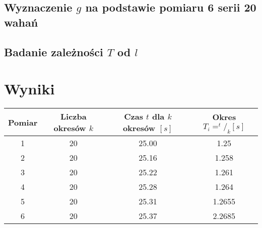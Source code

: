 \documentclass[11pt]{article}
\begin{document}
\subsection{Wyznaczenie $g$ na podstawie pomiaru 6 serii 20 wahań}
\subsection{Badanie zależności $T$ od $l$}

\section{Wyniki}
\begin{minipage}{\linewidth}
\centering
{} \label{tab:title} 
\begin{tabular}{c | c | c | c}
	Pomiar & Liczba okresów $k$ & Czas $t$ dla $k$ okresów $[s]$ & Okres $T_i = ^t/_k [s]$\\ \hline
	1 & 20 & 25.00 & 1.25\\
	2 & 20 & 25.16 & 1.258\\
	3 & 20 & 25.22 & 1.261\\
	4 & 20 & 25.28 & 1.264\\
	5 & 20 & 25.31 & 1.2655\\
	6 & 20 & 25.37 & 2.2685\\
\end{tabular}\par
\end{minipage}
\end{document}
